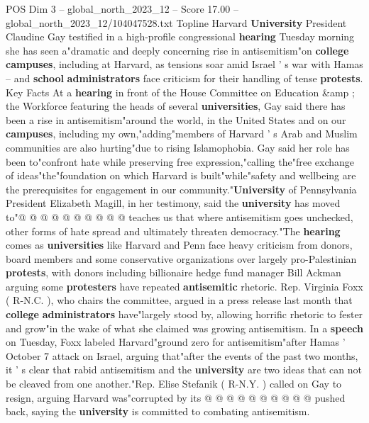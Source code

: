 \begin{textsample}{POS Dim 3 – global\_north\_2023\_12 – Score 17.00 – global\_north\_2023\_12/104047528.txt}  \label{ex:f3_pos_259}
Topline Harvard \textbf{University} President Claudine Gay testified in a high-profile congressional \textbf{hearing} Tuesday morning she has seen a"dramatic and deeply concerning rise in antisemitism"on \textbf{college} \textbf{campuses}, including at Harvard, as tensions soar amid Israel ' s war with Hamas -- and \textbf{school} \textbf{administrators} face criticism for their handling of tense \textbf{protests}.
Key Facts At a \textbf{hearing} in front of the House Committee on Education \&amp ; the Workforce featuring the heads of several \textbf{universities}, Gay said there has been a rise in antisemitism"around the world, in the United States and on our \textbf{campuses}, including my own,"adding"members of Harvard ' s Arab and Muslim communities are also hurting"due to rising Islamophobia.
Gay said her role has been to"confront hate while preserving free expression,"calling the"free exchange of ideas"the"foundation on which Harvard is built"while"safety and wellbeing are the prerequisites for engagement in our community."\textbf{University} of Pennsylvania President Elizabeth Magill, in her testimony, said the \textbf{university} has moved to"@ @ @ @ @ @ @ @ @ @ teaches us that where antisemitism goes unchecked, other forms of hate spread and ultimately threaten democracy."The \textbf{hearing} comes as \textbf{universities} like Harvard and Penn face heavy criticism from donors, board members and some conservative organizations over largely pro-Palestinian \textbf{protests}, with donors including billionaire hedge fund manager Bill Ackman arguing some \textbf{protesters} have repeated \textbf{antisemitic} rhetoric.
Rep.
Virginia Foxx ( R-N.C. ), who chairs the committee, argued in a press release last month that \textbf{college} \textbf{administrators} have"largely stood by, allowing horrific rhetoric to fester and grow"in the wake of what she claimed was growing antisemitism.
In a \textbf{speech} on Tuesday, Foxx labeled Harvard"ground zero for antisemitism"after Hamas ' October 7 attack on Israel, arguing that"after the events of the past two months, it ' s clear that rabid antisemitism and the \textbf{university} are two ideas that can not be cleaved from one another."Rep.
Elise Stefanik ( R-N.Y. ) called on Gay to resign, arguing Harvard was"corrupted by its @ @ @ @ @ @ @ @ @ @ pushed back, saying the \textbf{university} is committed to combating antisemitism.

\end{textsample}
